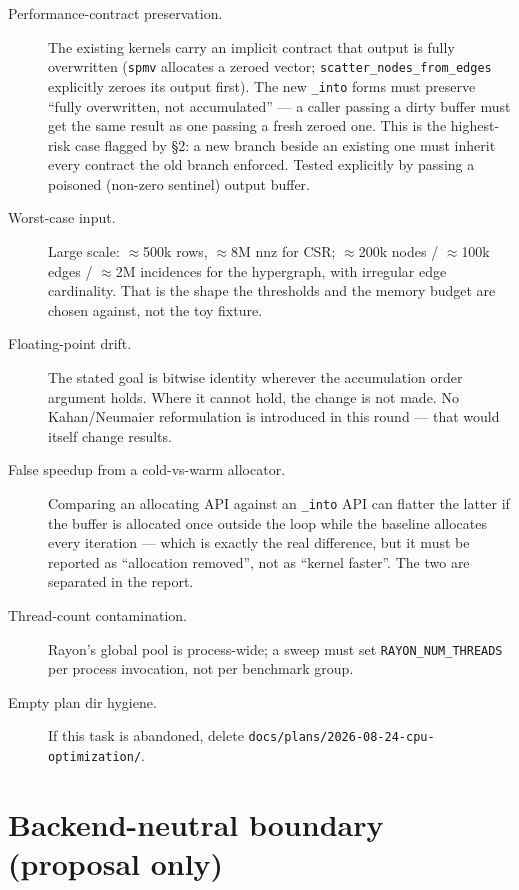 \documentclass[11pt,a4paper]{article}
\begin{document}
\begin{description}
  \item[Performance-contract preservation.] The existing kernels carry an
    implicit contract that output is fully overwritten (\texttt{spmv}
    allocates a zeroed vector; \texttt{scatter\_nodes\_from\_edges} explicitly
    zeroes its output first). The new \texttt{\_into} forms must preserve
    ``fully overwritten, not accumulated'' --- a caller passing a dirty
    buffer must get the same result as one passing a fresh zeroed one. This
    is the highest-risk case flagged by \S2: a new branch beside an existing
    one must inherit every contract the old branch enforced. Tested
    explicitly by passing a poisoned (non-zero sentinel) output buffer.
  \item[Worst-case input.] Large scale: $\approx$500k rows,
    $\approx$8M nnz for CSR; $\approx$200k nodes / $\approx$100k edges /
    $\approx$2M incidences for the hypergraph, with irregular edge
    cardinality. That is the shape the thresholds and the memory budget are
    chosen against, not the toy fixture.
  \item[Floating-point drift.] The stated goal is bitwise identity wherever
    the accumulation order argument holds. Where it cannot hold, the change
    is not made. No Kahan/Neumaier reformulation is introduced in this round
    --- that would itself change results.
  \item[False speedup from a cold-vs-warm allocator.] Comparing an
    allocating API against an \texttt{\_into} API can flatter the latter if
    the buffer is allocated once outside the loop while the baseline
    allocates every iteration --- which is exactly the real difference, but
    it must be reported as ``allocation removed'', not as ``kernel faster''.
    The two are separated in the report.
  \item[Thread-count contamination.] Rayon's global pool is process-wide;
    a sweep must set \texttt{RAYON\_NUM\_THREADS} per process invocation,
    not per benchmark group.
  \item[Empty plan dir hygiene.] If this task is abandoned, delete
    \texttt{docs/plans/2026-08-24-cpu-optimization/}.
\end{description}

\section{Backend-neutral boundary (proposal only)}
\label{sec:backend}
\end{document}
